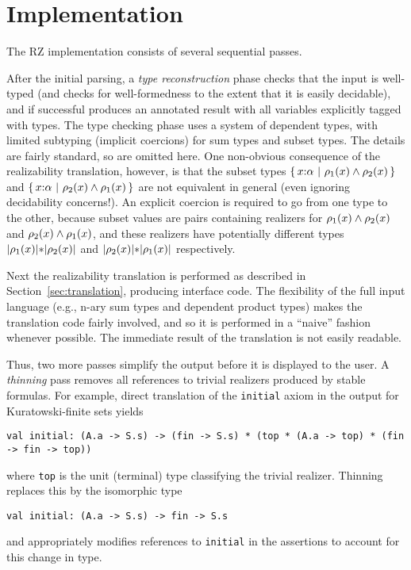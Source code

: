\section{Implementation}
\label{sec:implementation}

The RZ implementation consists of several sequential passes.  

After the initial parsing, a \emph{type reconstruction} phase checks that the input is well-typed (and checks for well-formedness to the extent that it is easily decidable), and if successful produces an annotated result with all variables explicitly tagged with types.  The type checking phase uses a system of dependent types, with limited subtyping (implicit coercions) for sum types and subset types.  The details are fairly standard, so are omitted here.  One non-obvious consequence of the realizability translation, however, is that the subset types $\{\,x{:}\alpha\ |\ \rho_1(x)\land \rho_2(x)\,\}$ and
$\{\,x{:}\alpha\ |\ \rho_2(x)\land \rho_1(x)\,\}$ are not equivalent in general (even ignoring decidability concerns!).  An explicit coercion is required to go from one type to the other, because subset values are pairs containing realizers for $\rho_1(x)\land \rho_2(x)$ and $\rho_2(x)\land \rho_1(x)$, and these realizers have potentially different types
$|\rho_1(x)|\mathtt{*}|\rho_2(x)|$ and $|\rho_2(x)|\mathtt{*}|\rho_1(x)|$ respectively.

Next the realizability translation is performed as described in Section~\ref{sec:translation}, producing interface code.  The flexibility of the full input language (e.g., n-ary sum types and dependent product types) makes the translation code fairly involved, and so it is performed in a ``naive'' fashion whenever possible.  The immediate result of the translation is not easily readable.
 
Thus, two more passes simplify the output before it is displayed to the user.  A \emph{thinning} pass removes all references to trivial realizers produced by stable formulas.  For example,  direct translation of the \texttt{initial} axiom in the output for Kuratowski-finite sets yields
\begin{Verbatim}
val initial: (A.a -> S.s) -> (fin -> S.s) * (top * (A.a -> top) * (fin -> fin -> top))
\end{Verbatim}
where \texttt{top} is the unit (terminal) type classifying the trivial realizer.  Thinning replaces this by the isomorphic type
\begin{Verbatim}
val initial: (A.a -> S.s) -> fin -> S.s
\end{Verbatim}
and appropriately modifies references to \texttt{initial} in the assertions to account for this change in type.

